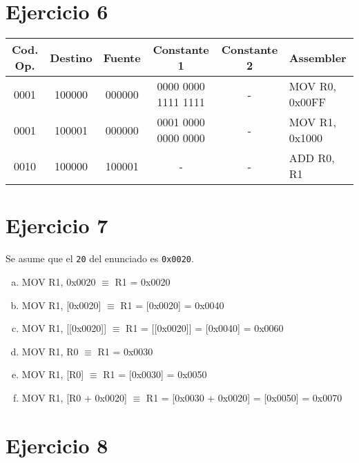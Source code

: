 \section{Ejercicio 6}

\begin{table}[ht]
\ttfamily\small
\begin{tabular}{|c|c|c|c|c|l|}
    Cod. Op. & Destino & Fuente & Constante 1 & Constante 2 & Assembler \\
    \hline
    0001 & 100000 & 000000 & 0000 0000 1111 1111 & - & MOV R0, 0x00FF \\
    0001 & 100001 & 000000 & 0001 0000 0000 0000 & - & MOV R1, 0x1000 \\
    0010 & 100000 & 100001 & - & - & ADD R0, R1 \\
\end{tabular}
\end{table}

\section{Ejercicio 7}

Se asume que el \lstinline{20} del enunciado es \lstinline{0x0020}.

\begin{enumerate}[a)]
    \ttfamily\small
    \item MOV R1, 0x0020 $\equiv$ R1 = 0x0020
    \item MOV R1, [0x0020] $\equiv$ R1 = [0x0020] = 0x0040
    \item MOV R1, [[0x0020]] $\equiv$ R1 = [[0x0020]] = [0x0040] = 0x0060
    \item MOV R1, R0 $\equiv$ R1 = 0x0030
    \item MOV R1, [R0] $\equiv$ R1 = [0x0030] = 0x0050
    \item MOV R1, [R0 + 0x0020] $\equiv$ R1 = [0x0030 + 0x0020] = [0x0050] = 0x0070
\end{enumerate}

\section{Ejercicio 8}

\subsection{}


